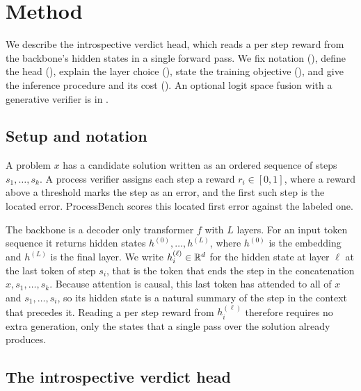
\section{Method}
\label{sec:method}

We describe the introspective verdict head, which reads a per step reward from the backbone's hidden states in a single forward pass. We fix notation (), define the head (), explain the layer choice (), state the training objective (), and give the inference procedure and its cost (). An optional logit space fusion with a generative verifier is in .

\subsection{Setup and notation}
\label{sec:method-setup}

A problem $x$ has a candidate solution written as an ordered sequence of steps $s_1,\dots,s_k$. A process verifier assigns each step a reward $r_i \in [0,1]$, where a reward above a threshold marks the step as an error, and the first such step is the located error. ProcessBench scores this located first error against the labeled one.

The backbone is a decoder only transformer $f$ with $L$ layers. For an input token sequence it returns hidden states $h^{(0)},\dots,h^{(L)}$, where $h^{(0)}$ is the embedding and $h^{(L)}$ is the final layer. We write $h_i^{(\ell)} \in \mathbb{R}^{d}$ for the hidden state at layer $\ell$ at the last token of step $s_i$, that is the token that ends the step in the concatenation $x, s_1, \dots, s_k$. Because attention is causal, this last token has attended to all of $x$ and $s_1,\dots,s_i$, so its hidden state is a natural summary of the step in the context that precedes it. Reading a per step reward from $h_i^{(\ell)}$ therefore requires no extra generation, only the states that a single pass over the solution already produces.

\subsection{The introspective verdict head}
\label{sec:method-head}

